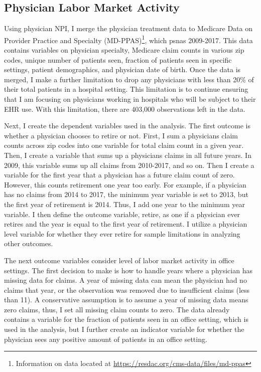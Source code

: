 \documentclass[11pt]{article}
\begin{document}
\subsection{Physician Labor Market Activity}\label{sec:appmdppas}

Using physician NPI, I merge the physician treatment data to Medicare Data on Provider Practice and Specialty (MD-PPAS)\footnote{Information on data located at \hyperlink{https://resdac.org/cms-data/files/md-ppas}{https://resdac.org/cms-data/files/md-ppas}}, which psnas 2009-2017. This data contains variables on physician specialty, Medicare claim counts in various zip codes, unique number of patients seen, fraction of patients seen in specific settings, patient demographics, and physician date of birth. Once the data is merged, I make a further limitation to drop any physicians with less than 20\% of their total patients in a hospital setting. This limitation is to continue ensuring that I am focusing on physicians working in hospitals who will be subject to their EHR use. With this limitation, there are 403,000 observations left in the data. 

Next, I create the dependent variables used in the analysis. The first outcome is whether a physician chooses to retire or not. First, I sum a physicians claim counts across zip codes into one variable for total claim count in a given year. Then, I create a variable that sums up a physicians claims in all future years. In 2009, this variable sums up all claims from 2010-2017, and so on. Then I create a variable for the first year that a physician has a future claim count of zero. However, this counts retirement one year too early. For example, if a physician has no claims from 2014 to 2017, the minimum year variable is set to 2013, but the first year of retirement is 2014. Thus, I add one year to the minimum year variable. I then define the outcome variable, retire, as one if a physician ever retires and the year is equal to the first year of retirement. I utilize a physician level variable for whether they ever retire for sample limitations in analyzing other outcomes. 

The next outcome variables consider level of labor market activity in office settings. The first decision to make is how to handle years where a physician has missing data for claims. A year of missing data can mean the physician had no claims that year, or the observation was removed due to insufficient claims (less than 11). A conservative assumption is to assume a year of missing data means zero claims, thus, I set all missing claim counts to zero. The data already contains a variable for the fraction of patients seen in an office setting, which is used in the analysis, but I further create an indicator variable for whether the physician sees any positive amount of patients in an office setting. 
\end{document}
